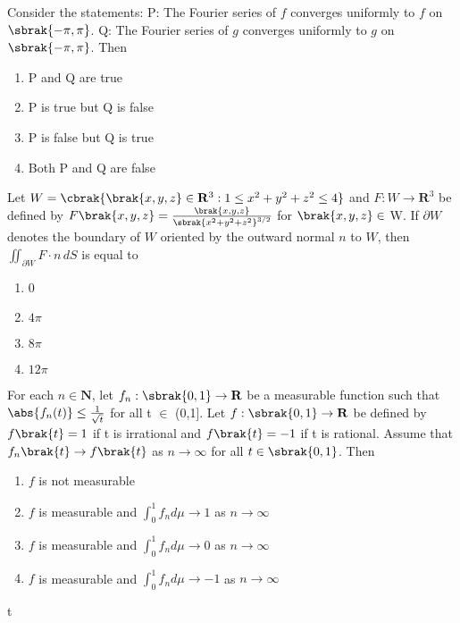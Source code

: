    Consider the statements:  
    P: The Fourier series of $f$ converges uniformly to $f$ on $\sbrak{-\pi, \pi}$.  
    Q: The Fourier series of $g$ converges uniformly to $g$ on $\sbrak{-\pi, \pi}$.  
    Then
    \begin{enumerate}
        \item P and Q are true
        \item P is true but Q is false
        \item P is false but Q is true
        \item Both P and Q are false
    \end{enumerate}
\item Let $W = \cbrak{\brak{x,y,z} \in \mathbf{R}^3 : 1 \leq x^2 + y^2 + z^2 \leq 4}$ and $F: W \to \mathbf{R}^3$ be defined by
    $
    F\brak{x, y, z} = \frac{\brak{x, y, z}}{\sbrak{x^2 + y^2 + z^2}^{3/2}}$ for $\brak{x, y, z} \in$ W.
    If $\partial W$ denotes the boundary of $W$ oriented by the outward normal $n$ to $W$, then
    $
    \iint_{\partial W} F \cdot n \, dS
    $
    is equal to
    \begin{enumerate}
        \item 0
        \item $4\pi$
        \item $8\pi$
        \item $12\pi$
    \end{enumerate}
    \item For each $n \in \mathbf{N}$, let $f_n: \sbrak{0,1} \to \mathbf{R}$ be a measurable function such that
    $
    \abs{f_n(t)} \leq \frac{1}{\sqrt{t}}
    $
    for all t $\in$ (0,1]. Let $f: \sbrak{0,1} \to \mathbf{R}$ be defined by
    $    f\brak{t} = 1 $ if t is irrational and $f\brak{t}=-1$ if t is rational.
    Assume that $f_n\brak{t} \to f\brak{t}$ as $n \to \infty$ for all $t \in \sbrak{0,1}$. Then
    \begin{enumerate}
        \item $f$ is not measurable
        \item $f$ is measurable and $\int_0^1 f_n d\mu \to 1$ as $n \to \infty$
        \item $f$ is measurable and $\int_0^1 f_n d\mu \to 0$ as $n \to \infty$
        \item $f$ is measurable and $\int_0^1 f_n d\mu \to -1$ as $n \to \infty$
    \end{enumerate}
t
